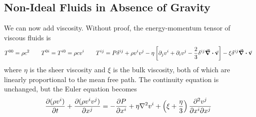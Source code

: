 \documentclass[a4paper,twoside,master.tex]{subfiles}
\begin{document}
\subsection{Non-Ideal Fluids in Absence of Gravity}\label{sub:non-ideal_fluids_in_absence_of_gravity}

We can now add viscosity. Without proof, the energy-momentum tensor of viscous fluids is
\begin{equation}
    T^{00} = \rho c^2 \qquad T^{0i} = T^{i0} = \rho c v^i \qquad T^{ij} = P \delta^{ij} + \rho v^i v^j - \eta \left[ \partial_j v^i + \partial_i v^j - \frac{2}{3} \delta^{ij} \div{\va{v}} \right] - \xi \delta^{ij} \div{\va{v}}
\end{equation}
where $ \eta $ is the sheer viscosity and $ \xi $ is the bulk viscosity, both of which are linearly proportional to the mean free path. The continuity equation is unchanged, but the Euler equation becomes
\begin{equation}
    \pdv{(\rho v^i)}{t}+ \pdv{(\rho v^i v^j)}{x^j} = - \pdv{P}{x^i} + \eta \laplacian{v^i} + \left( \xi + \frac{\eta}{3} \right) \pdv{v^j}{x^i}{x^j}
\end{equation}
\end{document}
